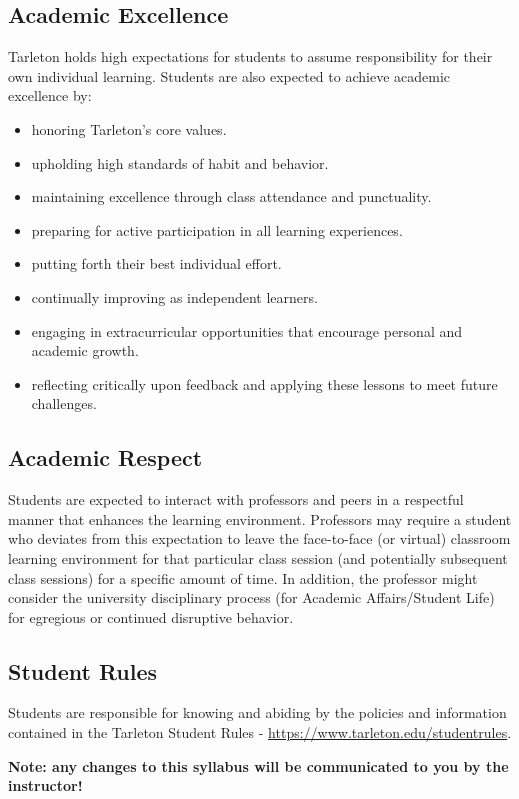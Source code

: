 \documentclass[10pt]{article}
\begin{document}
\subsection*{Academic Excellence}
\label{sec:org2171ab3}
Tarleton holds high expectations for students to assume responsibility for their own individual learning.  Students are also expected to achieve academic excellence by:
\begin{itemize}
\item honoring Tarleton’s core values.
\item upholding high standards of habit and behavior.
\item maintaining excellence through class attendance and punctuality.
\item preparing for active participation in all learning experiences.
\item putting forth their best individual effort.
\item continually improving as independent learners.
\item engaging in extracurricular opportunities that encourage personal and academic growth.
\item reflecting critically upon feedback and applying these lessons to meet future challenges.
\end{itemize}

\subsection*{Academic Respect}
\label{sec:org4dd0b8f}
Students are expected to interact with professors and peers in a respectful manner that enhances the learning environment. Professors may require a student who deviates from this expectation to leave the face-to-face (or virtual) classroom learning environment for that particular class session (and potentially subsequent class sessions) for a specific amount of time. In addition, the professor might consider the university disciplinary process (for Academic Affairs/Student Life) for egregious or continued disruptive behavior.


\subsection*{Student Rules}
\label{sec:orge8f8f46}
Students are responsible for knowing and abiding by the policies and information contained in the Tarleton Student Rules - \url{https://www.tarleton.edu/studentrules}.  

\textbf{Note:  any changes to this syllabus will be communicated to you by the instructor!}
\end{document}
